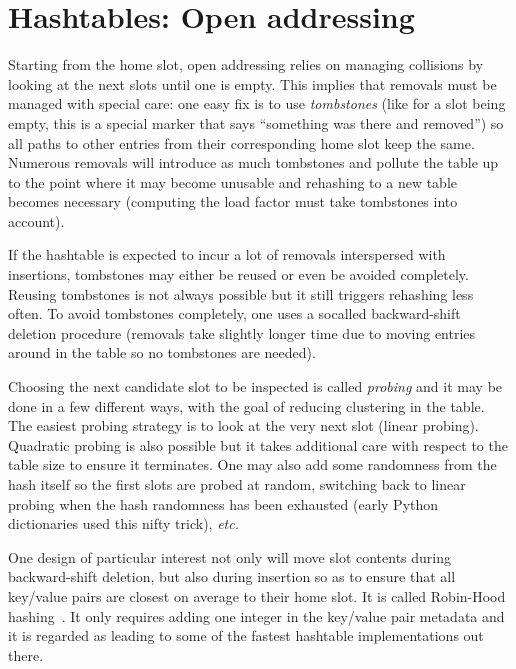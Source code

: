 \chapter{Hashtables: Open addressing}\label{chap:hashtables:open}

Starting from the home slot, open addressing relies on managing collisions by looking at the next slots until one is empty. This implies that removals must be managed with special care: one easy fix is to use \textit{tombstones} (like for a slot being empty, this is a special marker that says ``something was there and removed'') so all paths to other entries from their corresponding home slot keep the same. Numerous removals will introduce as much tombstones and pollute the table up to the point where it may become unusable and rehashing to a new table becomes necessary (computing the load factor must take tombstones into account).

If the hashtable is expected to incur a lot of removals interspersed with insertions, tombstones may either be reused or even be avoided completely. Reusing tombstones is not always possible but it still triggers rehashing less often. To avoid tombstones completely, one uses a socalled backward-shift deletion procedure (removals take slightly longer time due to moving entries around in the table so no tombstones are needed).

Choosing the next candidate slot to be inspected is called \textit{probing} and it may be done in a few different ways, with the goal of reducing clustering in the table. The easiest probing strategy is to look at the very next slot (linear probing). Quadratic probing is also possible but it takes additional care with respect to the table size to ensure it terminates. One may also add some randomness from the hash itself so the first slots are probed at random, switching back to linear probing when the hash randomness has been exhausted (early Python dictionaries used this nifty trick), \textit{etc.}

One design of particular interest not only will move slot contents during backward-shift deletion, but also during insertion so as to ensure that all key/value pairs are closest on average to their home slot. It is called Robin-Hood hashing~\cite{celis:robin:hood}\cite{pg:robin:hood}. It only requires adding one integer in the key/value pair metadata and it is regarded as leading to some of the fastest hashtable implementations out there. 

